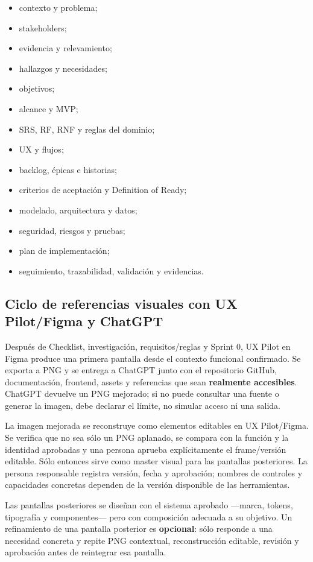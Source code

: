 \documentclass[11pt,a4paper]{article}
\begin{document}
\begin{itemize}
    \item contexto y problema;
    \item stakeholders;
    \item evidencia y relevamiento;
    \item hallazgos y necesidades;
    \item objetivos;
    \item alcance y MVP;
    \item SRS, RF, RNF y reglas del dominio;
    \item UX y flujos;
    \item backlog, épicas e historias;
    \item criterios de aceptación y Definition of Ready;
    \item modelado, arquitectura y datos;
    \item seguridad, riesgos y pruebas;
    \item plan de implementación;
    \item seguimiento, trazabilidad, validación y evidencias.
\end{itemize}

\subsection{Ciclo de referencias visuales con UX Pilot/Figma y ChatGPT}

Después de Checklist, investigación, requisitos/reglas y Sprint 0, UX Pilot en Figma produce una primera pantalla desde el contexto funcional confirmado. Se exporta a PNG y se entrega a ChatGPT junto con el repositorio GitHub, documentación, frontend, assets y referencias que sean \textbf{realmente accesibles}. ChatGPT devuelve un PNG mejorado; si no puede consultar una fuente o generar la imagen, debe declarar el límite, no simular acceso ni una salida.

La imagen mejorada se reconstruye como elementos editables en UX Pilot/Figma. Se verifica que no sea sólo un PNG aplanado, se compara con la función y la identidad aprobadas y una persona aprueba explícitamente el frame/versión editable. Sólo entonces sirve como master visual para las pantallas posteriores. La persona responsable registra versión, fecha y aprobación; nombres de controles y capacidades concretas dependen de la versión disponible de las herramientas.

Las pantallas posteriores se diseñan con el sistema aprobado —marca, tokens, tipografía y componentes— pero con composición adecuada a su objetivo. Un refinamiento de una pantalla posterior es \textbf{opcional}: sólo responde a una necesidad concreta y repite PNG contextual, reconstrucción editable, revisión y aprobación antes de reintegrar esa pantalla.
\end{document}

